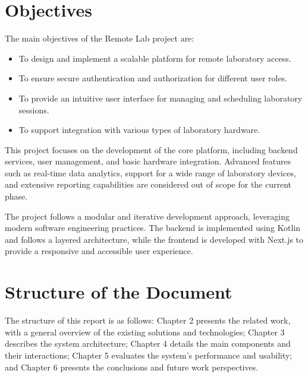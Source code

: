 %
%
\section{Objectives} \label{sec12}
The main objectives of the Remote Lab project are:
\begin{itemize}
    \item To design and implement a scalable platform for remote laboratory access.
    \item To ensure secure authentication and authorization for different user roles.
    \item To provide an intuitive user interface for managing and scheduling laboratory sessions.
    \item To support integration with various types of laboratory hardware.
\end{itemize}

This project focuses on the development of the core platform, including backend services, user management, and basic hardware integration. Advanced features such as real-time data analytics, support for a wide range of laboratory devices, and extensive reporting capabilities are considered out of scope for the current phase.

The project follows a modular and iterative development approach, leveraging modern software engineering practices. The backend is implemented using Kotlin and follows a layered architecture, while the frontend is developed with Next.js to provide a responsive and accessible user experience.

%
%
\section{Structure of the Document} \label{sec13}
The structure of this report is as follows: Chapter 2 presents the related work, with a general overview of the existing solutions and technologies; Chapter 3 describes the system architecture; Chapter 4 details the main components and their interactions; Chapter 5 evaluates the system's performance and usability; and Chapter 6 presents the conclusions and future work perspectives.